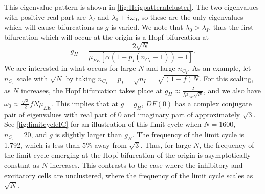 \documentclass[reqno]{siamonline190516}
\begin{document}
\noindent This eigenvalue pattern is shown in \cref{fig:HeigpatternIcluster}.
The two eigenvalues with positive real part are $\lambda_I$ and $\lambda_0 + i \omega_0$, so these are the only eigenvalues which will cause bifurcations as $g$ is varied. We note that $\lambda_0 > \lambda_I$, thus the first bifurcation which will occur at the origin is a Hopf bifurcation at 
\[
g_H = \frac{2 \sqrt{N}}{\mu_{EE} \left[ \alpha( 1 + p_I(n_{C_I}-1)) -1 \right] }.
\]
We are interested in what occurs for large $N$ and large $n_{C_I}$. As an example, let $n_{C_I}$ scale with $\sqrt{N}$ by taking $n_{C_I} = p_I = \sqrt{n_I} = \sqrt{(1-f)N}$. For this scaling, as $N$ increases, the Hopf bifurcation takes place at $g_H \approx \frac{2}{f \mu_{EE} \sqrt{N}}$, and we also have $\omega_0 \approx \frac{\sqrt{3}}{2}f N \mu_{EE}$. This implies that at $g = g_H$, $DF(0)$ has a complex conjugate pair of eigenvalues with real part of 0 and imaginary part of approximately $\sqrt{3}$. See \cref{fig:limitcycleIC} for an illustration of this limit cycle when $N=1600$, $n_{C_I}=20$, and $g$ is slightly larger than $g_H$. The frequency of the limit cycle is 1.792, which is less than $5\%$ away from $\sqrt{3}$. Thus, for large $N$, the frequency of the limit cycle emerging at the Hopf bifurcation of the origin is asymptotically constant as $N$ increases. This contrasts to the case where the inhibitory and excitatory cells are unclustered, where the frequency of the limit cycle scales as $\sqrt{N}$.
\end{document}
